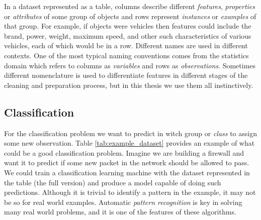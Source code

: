 In a dataset represented as a table, columns describe different \emph{features}, \emph{properties} or \emph{attributes} of some group of objects and rows represent \emph{instances} or \emph{examples} of that group. For example, if objects were vehicles then features could include the brand, power, weight, max\-imum speed, and other such characteristics of various vehicles, each of which would be in a row. Different names are used in different contexts. One of the most typical naming conventions comes from the statistics domain which refers to columns as \emph{variables} and rows as \emph{observations}. Sometimes different nomenclature is used to differentiate features in different stages of the cleaning and preparation process, but in this thesis we use them all instinctively.

\begin{table}[h]
    \caption{Example dataset extracted from the Internet Firewall Data (\cite{ertam_internet_2019}). Only five observations and main variables shown. }
    \label{tab:example_dataset}
\end{table}

\subsection{Classification}
\label{sec:ch4.classification}

For the classification problem we want to predict in witch group or \emph{class} to assign some new observation. Table \ref{tab:example_dataset} provides an example of what could be a good classification problem. Imagine we are building a firewall and want it to predict if some new packet in the network should be allowed to pass. We could train a classification learning machine with the dataset represented in the table (the full version) and produce a model capable of doing such predictions. Although it is trivial to identify a pattern in the example, it may not be so for real world examples. Automatic \emph{pattern recognition} is key in solving many real world problems, and it is one of the features of these algorithms.

